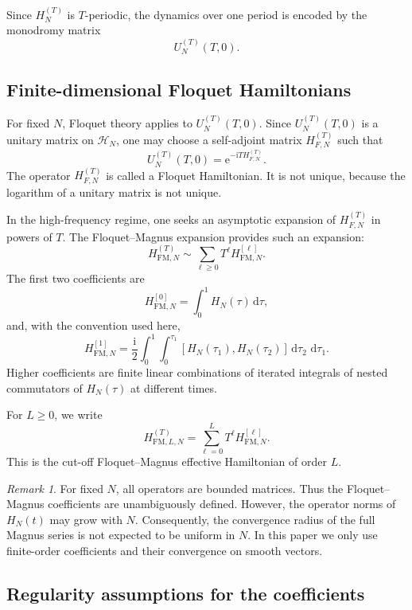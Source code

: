 \documentclass[11pt]{amsart}
\theoremstyle{plain}
\theoremstyle{definition}
\theoremstyle{remark}
\newtheorem{remark}[theorem]{Remark}
\newcommand{\Hilb}{\mathcal H}
\newcommand{\ii}{\mathrm i}
\newcommand{\ee}{\mathrm e}
\newcommand{\dd}{\,\mathrm d}
\begin{document}
Since \(H_N^{(T)}\) is \(T\)-periodic, the dynamics over one period is
encoded by the monodromy matrix
\[
        U_N^{(T)}(T,0).
\]

\subsection{Finite-dimensional Floquet Hamiltonians}

For fixed \(N\), Floquet theory applies to \(U_N^{(T)}(T,0)\).  Since
\(U_N^{(T)}(T,0)\) is a unitary matrix on \(\Hilb_N\), one may choose a
self-adjoint matrix \(H_{F,N}^{(T)}\) such that
\[
        U_N^{(T)}(T,0)
        =
        \ee^{-\ii T H_{F,N}^{(T)}}.
\]
The operator \(H_{F,N}^{(T)}\) is called a Floquet Hamiltonian.  It is
not unique, because the logarithm of a unitary matrix is not unique.

In the high-frequency regime, one seeks an asymptotic expansion of
\(H_{F,N}^{(T)}\) in powers of \(T\).  The Floquet--Magnus expansion
provides such an expansion:
\[
        H_{\mathrm{FM},N}^{(T)}
        \sim
        \sum_{\ell\geq0}T^\ell H_{\mathrm{FM},N}^{[\ell]}.
\]
The first two coefficients are
\[
        H_{\mathrm{FM},N}^{[0]}
        =
        \int_0^1 H_N(\tau)\dd\tau,
\]
and, with the convention used here,
\[
        H_{\mathrm{FM},N}^{[1]}
        =
        \frac{\ii}{2}
        \int_0^1
        \int_0^{\tau_1}
        [H_N(\tau_1),H_N(\tau_2)]
        \dd\tau_2\,\dd\tau_1.
\]
Higher coefficients are finite linear combinations of iterated
integrals of nested commutators of \(H_N(\tau)\) at different times.

For \(L\geq0\), we write
\[
        H_{\mathrm{FM},L,N}^{(T)}
        =
        \sum_{\ell=0}^{L}
        T^\ell H_{\mathrm{FM},N}^{[\ell]}.
\]
This is the cut-off Floquet--Magnus effective Hamiltonian of order
\(L\).

\begin{remark}
For fixed \(N\), all operators are bounded matrices.  Thus the
Floquet--Magnus coefficients are unambiguously defined.  However, the
operator norms of \(H_N(t)\) may grow with \(N\).  Consequently, the
convergence radius of the full Magnus series is not expected to be
uniform in \(N\).  In this paper we only use finite-order coefficients
and their convergence on smooth vectors.
\end{remark}

\subsection{Regularity assumptions for the coefficients}
\end{document}
